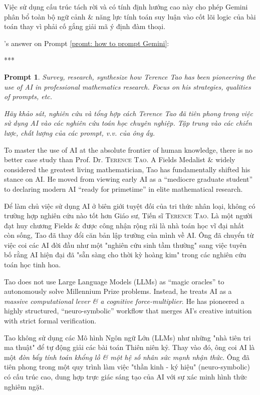 \documentclass{article}
\newtheorem{prompt}{Prompt}
\begin{document}
Việc sử dụng cấu trúc tách rời và có tính định hướng cao này cho phép Gemini phân bổ toàn bộ ngữ cảnh \& năng lực tính toán suy luận vào cốt lõi logic của bài toán thay vì phải cố gắng giải mã ý định đàm thoại.

's answer on Prompt \ref{promt: how to prompt Gemini}:

***





\begin{prompt}
	Survey, research, synthesize how Terence Tao has been pioneering the use of AI in professional mathematics research. Focus on his strategies, qualities of prompts, etc. 
	
	Hãy khảo sát, nghiên cứu và tổng hợp cách Terence Tao đã tiên phong trong việc sử dụng AI vào các nghiên cứu toán học chuyên nghiệp. Tập trung vào các chiến lược, chất lượng của các prompt, v.v. của ông ấy.
\end{prompt}
To master the use of AI at the absolute frontier of human knowledge, there is no better case study than Prof. Dr. \textsc{Terence Tao}. A Fields Medalist \& widely considered the greatest living mathematician, Tao has fundamentally shifted his stance on AI. He moved from viewing early AI as a ``mediocre graduate student'' to declaring modern AI ``ready for primetime'' in elite mathematical research.

Để làm chủ việc sử dụng AI ở biên giới tuyệt đối của tri thức nhân loại, không có trường hợp nghiên cứu nào tốt hơn Giáo sư, Tiến sĩ \textsc{Terence Tao}. Là một người đạt huy chương Fields \& được công nhận rộng rãi là nhà toán học vĩ đại nhất còn sống, Tao đã thay đổi căn bản lập trường của mình về AI. Ông đã chuyển từ việc coi các AI đời đầu như một "nghiên cứu sinh tầm thường" sang việc tuyên bố rằng AI hiện đại đã "sẵn sàng cho thời kỳ hoàng kim" trong các nghiên cứu toán học tinh hoa.

Tao does not use Large Language Models (LLMs) as ``magic oracles'' to autonomously solve Millennium Prize problems. Instead, he treats AI as a \textit{massive computational lever \& a cognitive force-multiplier}. He has pioneered a highly structured, ``neuro-symbolic'' workflow that merges AI's creative intuition with strict formal verification.

Tao không sử dụng các Mô hình Ngôn ngữ Lớn (LLMs) như những "nhà tiên tri ma thuật" để tự động giải các bài toán Thiên niên kỷ. Thay vào đó, ông coi AI là một \textit{đòn bẩy tính toán khổng lồ \& một hệ số nhân sức mạnh nhận thức}. Ông đã tiên phong trong một quy trình làm việc "thần kinh - ký hiệu" (neuro-symbolic) có cấu trúc cao, dung hợp trực giác sáng tạo của AI với sự xác minh hình thức nghiêm ngặt.
\end{document}
